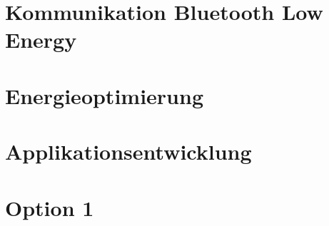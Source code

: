 \section{Kommunikation Bluetooth Low Energy}

\section{Energieoptimierung}



\section{Applikationsentwicklung}

\section{Option 1}






